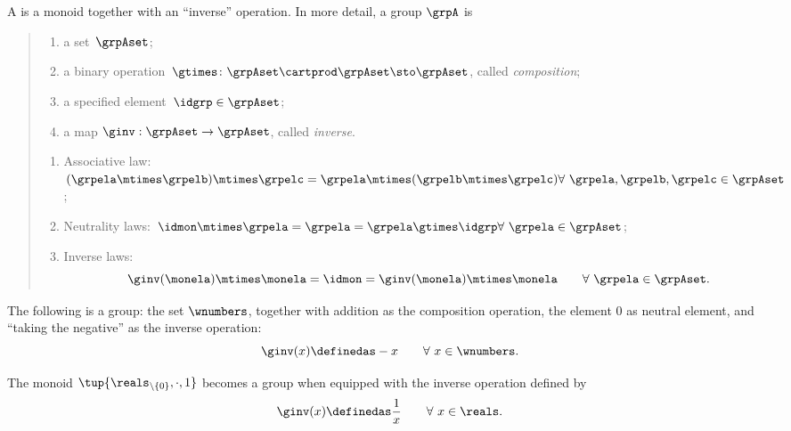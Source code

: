 \section{}\label{sec:groups}
\begin{ctdefinition}[Group]
  \label{def:group}
  A \emph{} is a monoid together with an ``inverse'' operation.
  In more detail, a group $\grpA$ is
  \begin{quote}
    \constit
    \begin{enumerate}
      \item a set~$\grpAset$;
      \item a binary operation~$\gtimes \colon \grpAset \cartprod \grpAset \sto \grpAset$, called \emph{composition};
      \item a specified element~$\idgrp \in \grpAset$;
      \item a map $\ginv: \grpAset \to \grpAset$, called \emph{inverse}.
    \end{enumerate}
    \condit
    \begin{enumerate}
      \item Associative law:~$(\grpela\mtimes \grpelb)\mtimes \grpelc=\grpela\mtimes (\grpelb\mtimes \grpelc) \hfill \forall \  \grpela, \grpelb, \grpelc \in \grpAset$;
       \item Neutrality laws:~$\idmon\mtimes \grpela=\grpela=\grpela \gtimes \idgrp \hfill \forall \  \grpela \in \grpAset$;
       \item Inverse laws:
       \begin{equation}\label{eq:group-inverse-law}
         \ginv(\monela) \mtimes \monela = \idmon = \ginv(\monela) \mtimes \monela \quad \quad \forall \  \grpela  \in \grpAset.
       \end{equation}
     \end{enumerate}
   \end{quote}
\end{ctdefinition}
\begin{example}
The following is a group: the set $\wnumbers$, together with addition as the composition operation, the element $0$ as neutral element, and ``taking the negative'' as the inverse operation:
\begin{equation}
\ginv(x) \definedas -x \quad \quad \forall \ x \in \wnumbers.
\end{equation}
\end{example}
\begin{example}
The monoid $\tup{\reals_{\backslash \{ 0 \}}, \cdot, 1}$ becomes a group when equipped with the inverse operation defined by
\begin{equation}
\ginv(x) \definedas \frac{1}{x} \quad \quad \forall \ x \in \reals.
\end{equation}
\end{example}
